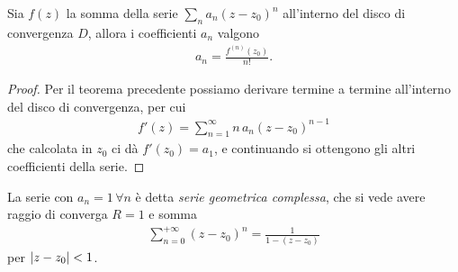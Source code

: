\begin{theorem}[  ] \label{thm: coefficienti sviluppo di Taylor}
  Sia $ f(z) $ la somma della serie $ \sum_n a_n (z - z_0)^n $ all'interno del disco di convergenza $ D $, allora i coefficienti $ a_n $ valgono
  \begin{align}
    a_n = \frac{f^{(n)}(z_0)}{n!}.
  \end{align}
\end{theorem}
\begin{proof}
  Per il teorema precedente possiamo derivare termine a termine all'interno del disco di convergenza, per cui
  \begin{align}
    f'(z) = \sum_{n = 1}^\infty n \, a_n (z - z_0)^{n-1}
  \end{align}
  che calcolata in $ z_0 $ ci dà $ f'(z_0) = a_1 $, e continuando si ottengono gli altri coefficienti della serie.
\end{proof}

\begin{example}
  La serie con $ a_n = 1 \,\forall n $ è detta \textit{serie geometrica complessa}, che si vede avere raggio di converga $ R = 1 $ e somma 
  \begin{align}
    \sum_{n= 0}^{+\infty} (z - z_0)^n = \frac1{1 - (z - z_0)}
  \end{align}
  per $ \left|{ z - z_0}\right| < 1 $.
\end{example}

